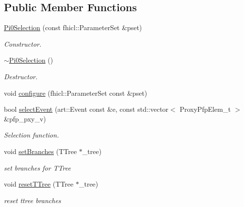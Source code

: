 \subsection*{Public Member Functions}
\begin{DoxyCompactItemize}
\item 
\hyperlink{classselection_1_1Pi0Selection_a96b0ec7f6597fa143e9478a6e71f5e76}{Pi0\-Selection} (const fhicl\-::\-Parameter\-Set \&pset)
\begin{DoxyCompactList}\small\item\em Constructor. \end{DoxyCompactList}\item 
\hypertarget{classselection_1_1Pi0Selection_ad691918c955035275406f16331ba0631}{\hyperlink{classselection_1_1Pi0Selection_ad691918c955035275406f16331ba0631}{$\sim$\-Pi0\-Selection} ()}\label{classselection_1_1Pi0Selection_ad691918c955035275406f16331ba0631}

\begin{DoxyCompactList}\small\item\em Destructor. \end{DoxyCompactList}\item 
void \hyperlink{classselection_1_1Pi0Selection_a0f845ce49bdafea967214a0ac981ab87}{configure} (fhicl\-::\-Parameter\-Set const \&pset)
\item 
bool \hyperlink{classselection_1_1Pi0Selection_a1efba82b7ec3c2e18a48a98605720009}{select\-Event} (art\-::\-Event const \&e, const std\-::vector$<$ Proxy\-Pfp\-Elem\-\_\-t $>$ \&pfp\-\_\-pxy\-\_\-v)
\begin{DoxyCompactList}\small\item\em Selection function. \end{DoxyCompactList}\item 
void \hyperlink{classselection_1_1Pi0Selection_ab5e8ca896ae6aa1e2e37c437a2b29016}{set\-Branches} (T\-Tree $\ast$\-\_\-tree)
\begin{DoxyCompactList}\small\item\em set branches for T\-Tree \end{DoxyCompactList}\item 
\hypertarget{classselection_1_1Pi0Selection_a70d28f2b466a735199640520c22fa725}{void \hyperlink{classselection_1_1Pi0Selection_a70d28f2b466a735199640520c22fa725}{reset\-T\-Tree} (T\-Tree $\ast$\-\_\-tree)}\label{classselection_1_1Pi0Selection_a70d28f2b466a735199640520c22fa725}

\begin{DoxyCompactList}\small\item\em reset ttree branches \end{DoxyCompactList}\end{DoxyCompactItemize}
